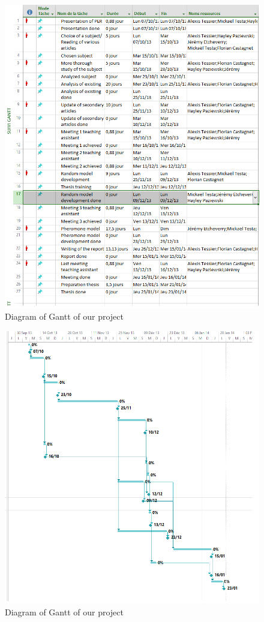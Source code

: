 \begin{figure}[htbf]
\center
\includegraphics[scale=0.7]{../images/Gantt1.png}
\caption{\label{Gantt}Diagram of Gantt of our project}
\end{figure}

\begin{figure}[htbf]
\center
\includegraphics[scale=0.7]{../images/Gantt2.png}
\caption{\label{Gantt}Diagram of Gantt of our project}
\end{figure}


